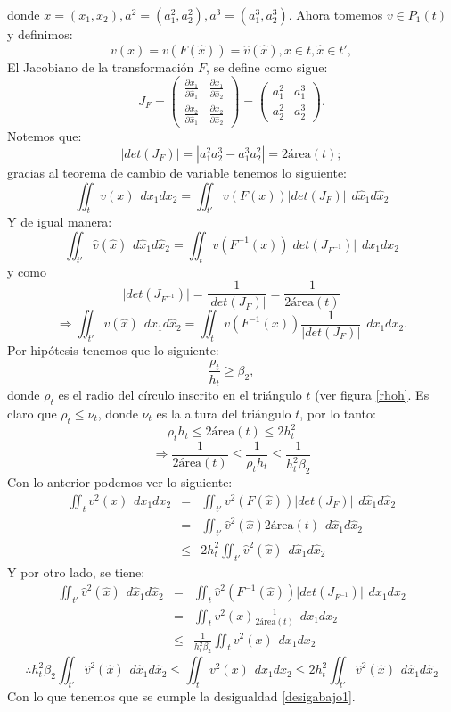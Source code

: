 \documentclass[12pt,spanish,oneside]{book}
\theoremstyle{plain}
\numberwithin{equation}{chapter}
\theoremstyle{definition}
\theoremstyle{remark}
\newcommand{\parc}[2]{\frac{\partial #1}{\partial #2}}
\newcommand{\dxhat}{\hspace{5pt} d\hat{x}_1d\hat{x}_2}
\newcommand{\dxt}{\hspace{5pt} dx_1dx_2}
\begin{document}
donde $x=(x_1,x_2),a^2=(a^2_1,a^2_2),a^3=(a^3_1,a^3_2)$. Ahora tomemos $v\in P_1(t)$ y definimos: 
\[v(x)=v(F(\hat{x}))=\hat{v}(\hat{x}), x\in t, \hat{x}\in t',\]
El Jacobiano de la transformación $F$, se define como sigue:
\[J_F=\left(\begin{array}{cc}
 \parc{x_1}{\hat{x}_{1}}&\parc{x_1}{\hat{x}_{2}}\\
 \parc{x_2}{\hat{x}_{1}}&\parc{x_2}{\hat{x}_{2}}
\end{array}\right)=\left(\begin{array}{cc}
a^2_1&a^3_1\\
a^2_2&a^3_2
\end{array}\right).\]
Notemos que:
\[|det(J_F)|=|a^2_1a^3_2-a^3_1a^2_2|=2\text{\'area}(t);\]
gracias al teorema de cambio de variable\cite{Apostol} tenemos lo siguiente:
\[\iint_{t}v(x)\dxt=\iint_{t'}v(F(x)) \Big|det(J_F)\Big|\dxhat\]
Y de igual manera: 
\[\iint_{t'}\hat{v}(\hat{x})\dxhat=\iint_{t}v(F^{-1}(x)) \Big|det(J_{F^{-1}})\Big|\dxt\]
y como 
\[ \Big|det(J_{F^{-1}})\Big|=\frac{1}{\Big|det(J_F)\Big|}=\frac{1}{2\text{\'area}(t)}\]
\[\Rightarrow\iint_{t'}\hat{v}(\hat{x})\dxhat=\iint_{t}v(F^{-1}(x))\frac{1}{\Big|det(J_F)\Big|} \dxt.\]
Por hipótesis tenemos que lo siguiente: 
\[ \frac{\rho_t}{h_{t}}\geq \beta_2, \]
donde $\rho_t$ es el radio del círculo inscrito en el triángulo $t$ (ver figura \ref{rhoh}. Es claro que $\rho_t\leq \nu_t$, donde $\nu_t$ es la altura del triángulo $t$, por lo tanto:
\[\rho_th_t\leq2\text{\'area}(t)\leq 2 h_t^2 \]
\[\Rightarrow \frac{1}{2\text{\'area}(t)}\leq \frac{1}{\rho_{t}h_{t}}\leq \frac{1}{h_{t}^2\beta_2}\]
Con lo anterior podemos ver lo siguiente: 
\begin{eqnarray*}
 \iint_tv^2(x)\dxt&=&\iint_{t'}v^2(F(\hat{x})) \Big|det(J_F)\Big|\dxhat\\
 &=& \iint_{t'}\hat{v}^2(\hat{x}) 2\text{\'area}(t)\dxhat\\
 &\leq& 2h_t^2\iint_{t'}\hat{v}^2(\hat{x}) \dxhat
\end{eqnarray*}
Y por otro lado, se tiene: 
\begin{eqnarray*}
 \iint_{t'}\hat{v}^2(\hat{x})\dxhat&=&\iint_{t}\hat{v}^2(F^{-1}(\hat{x})) \Big|det(J_{F^{-1}})\Big|\dxt\\
 &=& \iint_{t}v^2(x) \frac{1}{2\text{\'area}(t)}\dxt\\
 &\leq& \frac{1}{h_t^2\beta_2}\iint_{t}v^2(x) \dxt
\end{eqnarray*}
\[\therefore h_t^2\beta_2\iint_{t'}\hat{v}^2(\hat{x})\dxhat\leq\iint_tv^2(x)\dxt\leq 2h_t^2\iint_{t'}\hat{v}^2(\hat{x})\dxhat \]
Con lo que tenemos que se cumple la desigualdad \ref{desigabajo1}.
\end{document}
